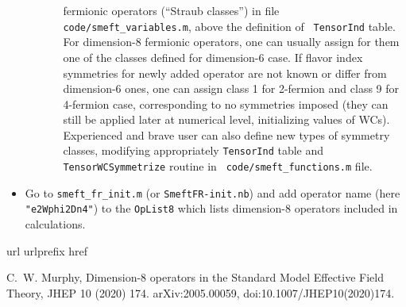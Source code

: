 \documentclass[a4paper,12pt]{article}
\numberwithin{equation}{section}
\begin{document}
\begin{itemize}
\begin{enumerate}
\begin{itemize}
      fermionic operators (``Straub classes'') in file {\tt
        code/smeft\_variables.m}, above the definition of {\tt
        TensorInd} table. For dimension-8 fermionic operators, one can
      usually assign for them one of the classes defined for
      dimension-6 case. If flavor index symmetries for newly added
      operator are not known or differ from dimension-6 ones, one can
      assign class 1 for 2-fermion and class 9 for 4-fermion case,
      corresponding to no symmetries imposed (they can still be
      applied later at numerical level, initializing values of
      WCs). Experienced and brave user can also define new types of
      symmetry classes, modifying appropriately {\tt TensorInd} table
      and {\tt TensorWCSymmetrize} routine in {\tt
        code/smeft\_functions.m} file.
      \end{itemize}
\end{enumerate}
\item Go to {\tt smeft\_fr\_init.m} (or {\tt SmeftFR-init.nb}) and add
  operator name (here {\tt "e2Wphi2Dn4"}) to the {\tt OpList8} which
  lists dimension-8 operators included in calculations.
\end{itemize}


\begin{thebibliography}{1}
\expandafter\ifx\csname url\endcsname\relax
  \def\url#1{\texttt{#1}}\fi
\expandafter\ifx\csname urlprefix\endcsname\relax\def\urlprefix{URL }\fi
\expandafter\ifx\csname href\endcsname\relax
  \def\href#1#2{#2} \def\path#1{#1}\fi

 C.~W. Murphy, {Dimension-8 operators in the
  Standard Model Effective Field Theory}, JHEP 10 (2020) 174.  \newblock
  \href {http://arxiv.org/abs/2005.00059} {\path{arXiv:2005.00059}},
  \href {https://doi.org/10.1007/JHEP10(2020)174}
        {\path{doi:10.1007/JHEP10(2020)174}}.

\end{thebibliography}
\end{document}
